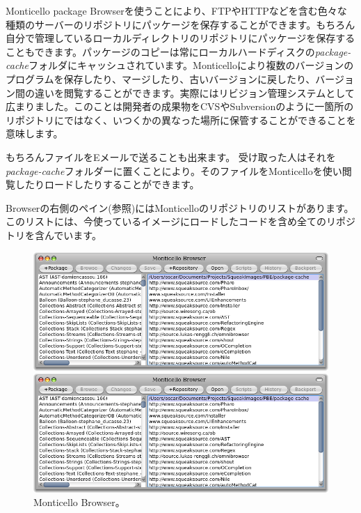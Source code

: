 \documentclass[a4paper,10pt,twoside]{book}
\begin{document}
Monticello package Browserを使うことにより、FTPやHTTPなどを含む色々な種類のサーバーのリポジトリにパッケージを保存することができます。もちろん自分で管理しているローカルディレクトリのリポジトリにパッケージを保存することもできます。パッケージのコピーは常にローカルハードディスクの\emph{package-cache}フォルダにキャッシュされています。Monticelloにより複数のバージョンのプログラムを保存したり、マージしたり、古いバージョンに戻したり、バージョン間の違いを閲覧することができます。実際にはリビジョン管理システムとして広まりました。このことは開発者の成果物をCVSやSubversionのように一箇所のリポジトリにではなく、いつくかの異なった場所に保管することができることを意味します。

もちろんファイルをEメールで送ることも出来ます。
受け取った人はそれを\emph{package-cache}フォルダーに置くことにより。そのファイルをMonticelloを使い閲覧したりロードしたりすることができます。

Browserの右側のペイン(参照)にはMonticelloのリポジトリのリストがあります。このリストには、今使っているイメージにロードしたコードを含め全てのリポジトリを含んでいます。
 

\begin{figure}[hbt]
\ifluluelse
	{\centerline {\includegraphics[width=\textwidth]{MonticelloBrowser}}}
	{\centerline {\includegraphics[scale=0.7]{MonticelloBrowser}}}
\caption{Monticello Browser。
}
\end{figure}
\end{document}
